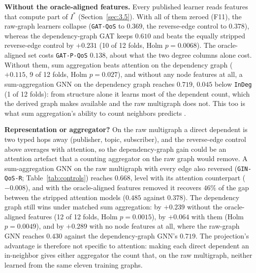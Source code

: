 \documentclass[preprint,3p]{elsarticle}
\begin{document}
\noindent\textbf{Without the oracle-aligned features.} Every published learner reads features that compute part of $I^*$ (Section~\ref{sec:3.5}). With all of them zeroed (F11), the raw-graph learners collapse (\texttt{GAT-QoS} to $0.369$, the reverse-edge control to $0.378$), whereas the dependency-graph GAT keeps $0.610$ and beats the equally stripped reverse-edge control by $+0.231$ (10 of 12 folds, Holm $p = 0.0068$). The oracle-aligned set costs \texttt{GAT-P-QoS} $0.138$, about what the two degree columns alone cost. Without them, sum aggregation beats attention on the dependency graph ($+0.115$, 9 of 12 folds, Holm $p = 0.027$), and without any node features at all, a sum-aggregation GNN on the dependency graph reaches $0.719$, $0.045$ below \texttt{InDeg} (1 of 12 folds): from structure alone it learns most of the dependent count, which the derived graph makes available and the raw multigraph does not. This too is what sum aggregation's ability to count neighbors predicts \cite{xu2019gin,chen2020can}.

\noindent\textbf{Representation or aggregator?} On the raw multigraph a direct dependent is two typed hops away (publisher, topic, subscriber), and the reverse-edge control above averages with attention, so the dependency-graph gain could be an attention artefact that a counting aggregator on the raw graph would remove. A sum-aggregation GNN on the raw multigraph with every edge also reversed (\texttt{GIN-QoS-R}; Table~\ref{tab:controls}) reaches $0.668$, level with its attention counterpart ($-0.008$), and with the oracle-aligned features removed it recovers $46\%$ of the gap between the stripped attention models ($0.485$ against $0.378$). The dependency graph still wins under matched sum aggregation: by $+0.239$ without the oracle-aligned features (12 of 12 folds, Holm $p = 0.0015$), by $+0.064$ with them (Holm $p = 0.0049$), and by $+0.289$ with no node features at all, where the raw-graph GNN reaches $0.430$ against the dependency-graph GNN's $0.719$. The projection's advantage is therefore not specific to attention: making each direct dependent an in-neighbor gives either aggregator the count that, on the raw multigraph, neither learned from the same eleven training graphs.
\end{document}
